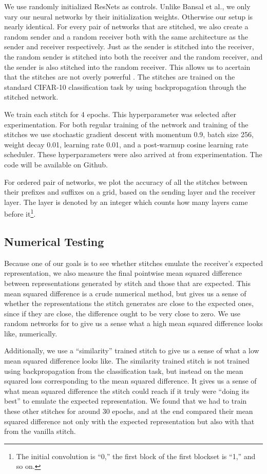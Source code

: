 \documentclass{article} %
\begin{document}
We use randomly initialized ResNets as controls. Unlike Bansal et al., we only vary our neural networks by their
initialization weights. Otherwise our setup is nearly identical.
For every pair of networks that are stitched, we also create a random sender and a random
receiver both with the same architecture as the sender and receiver respectively. Just as the sender is stitched
into the receiver, the random sender is stitched into both the receiver and the random receiver, and the sender
is also stitched into the random receiver. This allows us to acertain that the stitches
are not overly powerful \cite{Bansal2021RevisitingMS}. The stitches are trained on
the standard CIFAR-10 classification task by using backpropagation through the stitched network.

We train each stitch for 4 epochs. This hyperparameter was selected after experimentation. For both
regular training of the network and training of the stitches we use stochastic gradient descent with momentum 0.9,
batch size 256, weight decay 0.01, learning rate 0.01, and a post-warmup cosine learning rate scheduler.
These hyperparameters were also arrived at from experimentation. The code will be available on Github.

For ordered pair of networks, we plot the accuracy of all the stitches between their prefixes and suffixes
on a grid, based on the sending layer and the receiver layer. The layer is
denoted by an integer which counts how many layers came before it\footnote{
   The initial convolution is ``0,'' the first block of the first blockset is ``1,'' and so on.
}.

\subsection*{Numerical Testing}
Because one of our goals is to see whether stitches emulate the receiver's expected representation, we
also measure the final pointwise mean squared difference between representations generated by stitch and
those that are expected. This mean squared difference is a crude numerical method, 
but gives us a sense of whether the representations
the stitch generates are close to the expected ones, since if they are close, the difference ought to be very close
to zero. We use random networks for to give us a sense what a high mean squared difference
looks like, numerically.

Additionally, we use a ``similarity'' trained stitch to give us a sense of what a low mean
squared difference looks like. The similarity trained stitch is not trained using backpropagation
from the classification task, but instead on the mean squared loss corresponding to the mean squared difference.
It gives us a sense of what mean squared difference the stitch could reach if it truly were ``doing its best''
to emulate the expected representation. We found that we had to train these other stitches for around 30 epochs, and
at the end compared their mean squared difference not only with the expected representation but also with that
from the vanilla stitch.
\end{document}

